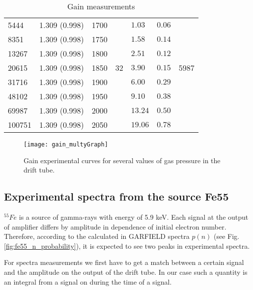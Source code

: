 \begin{table}[!h]
\begin{tabular}{|l|l|l|l|l|l|l|}
		& & & & & & \\
		\hline
		
		5444 & 1.309 (0.998) & 1700 &  & $1.03 $ & $ 0.06 $ & \\
		\hline
		8351 & 1.309 (0.998) & 1750 &  & $1.58 $ & $ 0.14$ & \\
		\hline
		13267 & 1.309 (0.998) & 1800 &  & $2.51 $ & $ 0.12 $ & \\
		\hline
		20615 & 1.309 (0.998) & 1850 & 32 & $3.90 $ & $ 0.15 $ & 5987 \\
		\hline
		31716 & 1.309 (0.998) & 1900 &  & $6.00 $ & $ 0.29 $ & \\
		\hline
		48102 & 1.309 (0.998) & 1950 &  & $9.10 $ & $ 0.38 $ & \\
		\hline
		69987 & 1.309 (0.998) & 2000 &  & $13.24 $ & $ 0.50 $ & \\
		\hline
		100751 & 1.309 (0.998) & 2050 &  & $19.06 $ & $ 0.78 $ & \\
		\hline
		
	\end{tabular}
	\caption{Gain measurements}
	\label{table:GainTotal}
	\end{table}
	
	\begin{figure}[!h]
	\centering
	\texttt{[image: gain\_multyGraph]}
	\caption{Gain experimental curves for several values of gas pressure in the drift tube.}
	\label{fig:Gain_multy}
	\end{figure}
		
	
	\subsection{Experimental spectra from the source Fe55}
		
	$^{55}Fe$  is a source of gamma-rays with energy of 5.9 keV. Each signal at the output of amplifier differs by amplitude in dependence of initial electron number. Therefore, according to the calculated in GARFIELD spectra $p(n)$ (see Fig.\ref{fig:fe55_n_probability}), it is expected to see two peaks in experimental spectra.
	
	For spectra measurements we first have to get a match between a certain signal and the amplitude on the output of the drift tube. In our case such a quantity is an integral from a signal on during the time of a signal.
	
